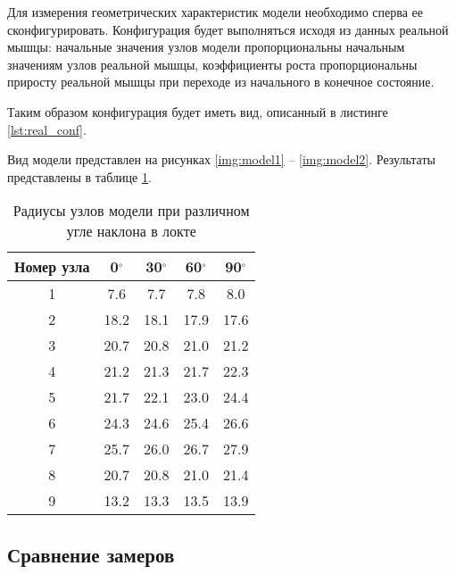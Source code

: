 Для измерения геометрических характеристик модели необходимо сперва ее сконфигурировать. Конфигурация будет выполняться исходя из данных реальной мышцы: начальные значения узлов модели пропорциональны начальным значениям узлов реальной мышцы, коэффициенты роста пропорциональны приросту реальной мышцы при переходе из начального в конечное состояние.

Таким образом конфигурация будет иметь вид, описанный в листинге \ref{lst:real_conf}.

Вид модели представлен на рисунках \ref{img:model1} -- \ref{img:model2}. Результаты представлены в таблице \ref{tab:model}. 


\begin{table}[!h]
    \begin{center}
        \begin{tabular}{|c|c|c|c|c|}
            \hline
            Номер узла & 0$^\circ$ & 30$^\circ$ & 60$^\circ$ & 90$^\circ$ \\
            \hline
            \hline
            1 & 7.6 &   7.7 &  7.8 &  8.0 \\
            \hline
            2 & 18.2 & 18.1 & 17.9 & 17.6 \\
            \hline
            3 & 20.7 & 20.8 & 21.0 & 21.2 \\
            \hline
            4 & 21.2 & 21.3 & 21.7 & 22.3 \\
            \hline
            5 & 21.7 & 22.1 & 23.0 & 24.4 \\
            \hline
            6 & 24.3 & 24.6 & 25.4 & 26.6 \\
            \hline
            7 & 25.7 & 26.0 & 26.7 & 27.9 \\
            \hline
            8 & 20.7 & 20.8 & 21.0 & 21.4 \\
            \hline
            9 & 13.2 & 13.3 & 13.5 & 13.9 \\
            \hline
        \end{tabular}
    \end{center}
    \caption{\label{tab:model} Радиусы узлов модели при различном угле наклона в локте}
\end{table}

\subsection{Сравнение замеров}

